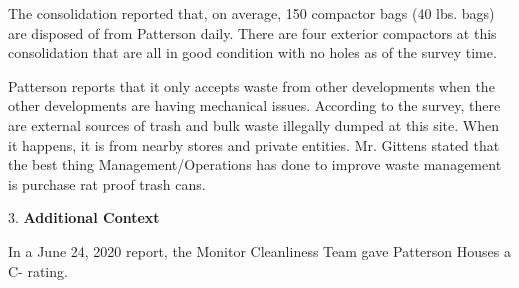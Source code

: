 The consolidation reported that, on average, 150 compactor bags (40 lbs. bags) are disposed of from Patterson daily. There are four exterior compactors at this consolidation that are all in good condition with no holes as of the survey time.  

Patterson reports that it only accepts waste from other developments when the other developments are having mechanical issues.  According to the survey, there are external sources of trash and bulk waste illegally dumped at this site. When it happens, it is from nearby stores and private entities. Mr. Gittens stated that the best thing Management/Operations has done to improve waste management is purchase rat proof trash cans.

3. \textbf{Additional Context}

In a June 24, 2020 report, the Monitor Cleanliness Team gave Patterson Houses a C- rating. 